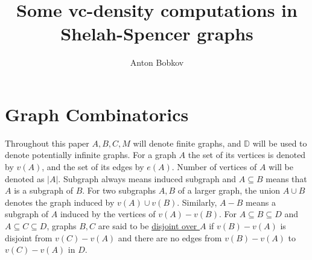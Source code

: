 \documentclass{amsart}
\title{Some vc-density computations in Shelah-Spencer graphs}
\author{Anton Bobkov}
\newcommand{\defn}{\underline}
\newcommand{\DB}{\mathbb D}
\newcommand{\A}{A}
\newcommand{\B}{B}
\begin{document}
\section{Graph Combinatorics}

Throughout this paper $A, B, C, M$ will denote finite graphs, and $\DB$ will be used to denote potentially infinite graphs.
For a graph $\A$ the set of its vertices is denoted by $v(\A)$, and the set of its edges by $e(\A)$.
Number of vertices of $\A$ will be denoted as $|\A|$.
Subgraph always means induced subgraph and $A \subseteq B$ means that $A$ is a subgraph of $B$.
For two subgraphs $\A, \B$ of a larger graph, the union $\A \cup \B$ denotes the graph induced by $v(\A) \cup v(\B)$.
Similarly, $A - B$ means a subgraph of $A$ induced by the vertices of $v(A) - v(B)$.
For $A \subseteq B \subseteq D$ and $A \subseteq C \subseteq D$,
graphs $B,C$ are said to be \defn{disjoint over $A$} if $v(B) - v(A)$ is disjoint from $v(C) - v(A)$
and there are no edges from $v(B) - v(A)$ to $v(C) - v(A)$ in $D$.
\end{document}
